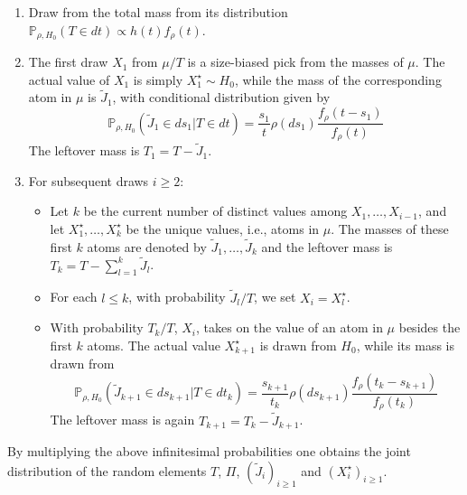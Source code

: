 \begin{enumerate}[label=(\roman*)]
    \item Draw from the total mass from its distribution $\mathbb{P}_{\rho,H_0}(T \in dt) \propto h(t) f_\rho(t)$.
    \item The first draw $X_1$ from $\mu/T$ is a size-biased pick from the masses of $\mu$. The actual
value of $X_1$ is simply $X_1^\star \sim H_0$, while the mass of the corresponding atom in $\mu$ is
$\tilde{J}_1$, with conditional distribution given by
$$ \mathbb{P}_{\rho,H_0}(\tilde{J}_1 \in ds_1 | T \in dt) = \frac{s_1}{t}\rho(ds_1)\frac{f_\rho(t - s_1)}{f_\rho(t)} $$
The leftover mass is $T_1 = T - \tilde{J}_1$.
    \item For subsequent draws $i \ge 2:$
    \begin{itemize}
        \item Let $k$ be the current number of distinct values among $X_1,\dots,X_{i-1}$, and let
$X_1^\star,\dots,X_{k}^\star$ be the unique values, i.e., atoms in $\mu$. The masses of these first
$k$ atoms are denoted by $\tilde{J}_{1},\dots,\tilde{J}_{k}$ and the leftover mass is $T_k = T - \sum_{l=1}^k{\tilde{J}_{l}}$.
        \item For each $l \le k$, with probability $\tilde{J}_l / T$, we set $X_i = X_l^\star$.
        \item With probability $T_k / T$, $X_i$, takes on the value of an atom in $\mu$ besides the first $k$ atoms. The actual value $X_{k+1}^\star$ is drawn from $H_0$, while its mass is drawn from
        $$ \mathbb{P}_{\rho,H_0}(\tilde{J}_{k+1} \in ds_{k+1} | T \in dt_k) = \frac{s_{k+1}}{t_k}\rho(ds_{k+1})\frac{f_\rho(t_k - s_{k+1})}{f_\rho(t_k)} $$
        The leftover mass is again $T_{k+1} = T_k - \tilde{J}_{k+1}$.
    \end{itemize}
\end{enumerate}

By multiplying the above infinitesimal probabilities one obtains the joint distribution of the random elements $T$, $\Pi$, $(\tilde{J}_i)_{i \ge 1}$ and $(X_i^\star)_{i \ge 1}$. \\

